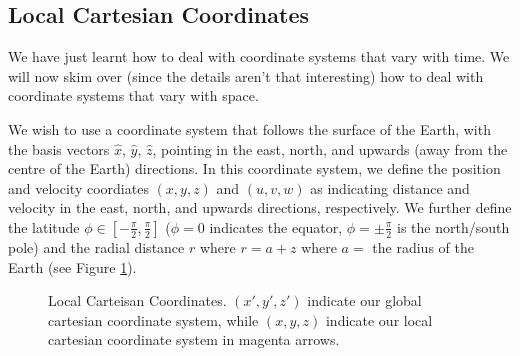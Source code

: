 \subsection{Local Cartesian Coordinates}

We have just learnt how to deal with coordinate systems that vary with time. We will now skim over (since the details aren't that interesting) how to deal with coordinate systems that vary with space.

We wish to use a coordinate system that follows the surface of the Earth, with the basis vectors $\hat{x}$, $\hat{y}$, $\hat{z}$, pointing in the east, north, and upwards (away from the centre of the Earth) directions. In this coordinate system, we define the position and velocity coordiates $(x,y,z)$ and $(u,v,w)$ as indicating distance and velocity in the east, north, and upwards directions, respectively. We further define the latitude $\phi\in[-\frac{\pi}{2},\frac{\pi}{2}]$ ($\phi=0$ indicates the equator, $\phi=\pm\frac{\pi}{2}$ is the north/south pole) and the radial distance $r$ where $r=a+z$ where $a=$ the radius of the Earth (see Figure \ref{LocCartes}).
\begin{figure}[H]
    \centering
    \caption{Local Carteisan Coordinates. $(x',y',z')$ indicate our global cartesian coordinate system, while $(x,y,z)$ indicate our local cartesian coordinate system in magenta arrows.}
    \label{LocCartes}
\end{figure}
